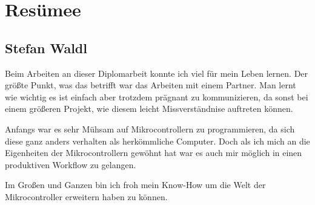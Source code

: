 \chapter{Resümee}
\section{Stefan Waldl}
Beim Arbeiten an dieser Diplomarbeit konnte ich viel für mein Leben lernen. Der größte Punkt, was das betrifft war das Arbeiten mit einem Partner. Man lernt wie wichtig es ist einfach aber trotzdem prägnant zu kommunizieren, da sonst bei einem größeren Projekt, wie diesem leicht Missverständnise auftreten können.

Anfangs war es sehr Mühsam auf Mikrocontrollern zu programmieren, da sich diese ganz anders verhalten als herkömmliche Computer. Doch als ich mich an die Eigenheiten der Mikrocontrollern gewöhnt hat war es auch mir möglich in einen produktiven Workflow zu gelangen.

Im Großen und Ganzen bin ich froh mein Know-How um die Welt der Mikrocontroller erweitern haben zu können.